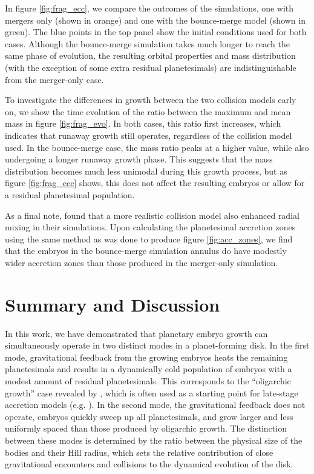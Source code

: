 \documentclass[twocolumn,linenumbers]{aastex63}
\begin{document}
In figure \ref{fig:frag_ecc}, we compare the outcomes of the simulations, one with mergers only (shown in orange) and one with 
the bounce-merge model (shown in green). The blue points in the top panel show the initial conditions used for both cases. 
Although the bounce-merge simulation takes much longer to reach the same phase of evolution, the resulting orbital properties 
and mass distribution (with the exception of some extra residual planetesimals) are indistinguishable from the merger-only case.

To investigate the differences in growth between the two collision models early on, we show the time evolution of the ratio 
between the maximum and mean mass in figure \ref{fig:frag_evo}. In both cases, this ratio first increases, which indicates that 
runaway growth still operates, regardless of the collision model used. In the bounce-merge case, the mass ratio peaks at a 
higher value, while also undergoing a longer runaway growth phase. This suggests that the mass distribution becomes much 
less unimodal during this growth process, but as figure \ref{fig:frag_ecc} shows, this does not affect the resulting embryos or 
allow for a residual planetesimal population.

As a final note, \citet{childs22} found that a more realistic collision model also enhanced radial mixing in their simulations. Upon 
calculating the planetesimal accretion zones using the same method as was done to produce figure \ref{fig:acc_zones}, we find 
that the embryos in the bounce-merge simulation annulus do have modestly wider accretion zones than those produced in the 
merger-only simulation.

\section{Summary and Discussion} \label{sec:discuss}

In this work, we have demonstrated that planetary embryo growth
can simultaneously operate in two distinct modes in a planet-forming disk. In the first
mode, gravitational feedback from the growing embryos heats the
remaining planetesimals and results in a dynamically cold population
of embryos with a modest amount of residual planetesimals. This
corresponds to the ``oligarchic growth'' case revealed by \citep{kokubo98}, which is often used as a starting point for late-stage 
accretion models (e.g. \citet{kokubo02, raymond05, raymond06}). In the second mode, the gravitational feedback does not 
operate, embryos quickly sweep up all planetesimals, and grow larger and less uniformly spaced than those produced by 
oligarchic growth. The distinction between these modes is determined
by the ratio between the physical size of the bodies and their 
Hill radius, which sets the relative contribution of close gravitational encounters and collisions to the dynamical evolution of the 
disk.
\end{document}
